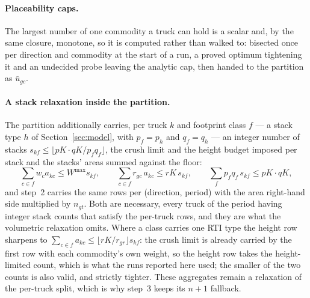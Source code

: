 \paragraph{Placeability caps.}
The largest number of one commodity a truck can hold is a scalar and,
by the same closure, monotone, so it is computed rather than walked to:
bisected once per direction and commodity at the start of a run, a
proved optimum tightening it and an undecided probe leaving the
analytic cap, then handed to the partition as $\bar u_{gc}$.

\paragraph{A stack relaxation inside the partition.}
The partition additionally carries, per truck $k$ and footprint class
$f$ --- a stack type $h$ of Section~\ref{sec:model}, with
$p_{f}=p_{h}$ and $q_{f}=q_{h}$ --- an integer number of stacks
$s_{kf}\le\lfloor pK\cdot qK/p_{f}q_{f}\rfloor$, the crush limit and
the height budget imposed per stack and the stacks' areas summed
against the floor:
\begin{equation}
\sum_{c\in f}w_{c}a_{kc}\le W^{\max}s_{kf},
\qquad
\sum_{c\in f}r_{gc}\,a_{kc}\le rK\,s_{kf},
\qquad
\sum_{f}p_{f}q_{f}\,s_{kf}\le pK\cdot qK ,
\label{eq:stackrows}
\end{equation}
and step~2 carries the same rows per (direction, period) with the area
right-hand side multiplied by $n_{gt}$. Both are necessary, every truck
of the period having integer stack counts that satisfy the per-truck
rows, and they are what the volumetric relaxation omits. Where a class
carries one RTI type the height row sharpens to
$\sum_{c\in f}a_{kc}\le\lfloor rK/r_{gr}\rfloor s_{kf}$: the crush
limit is already carried by the first row with each commodity's own
weight, so the height row takes the height-limited count, which is what
the runs reported here used; the smaller of the two counts is also
valid, and strictly tighter. These aggregates remain a relaxation of
the per-truck split, which is why step~3 keeps its $n+1$ fallback.

